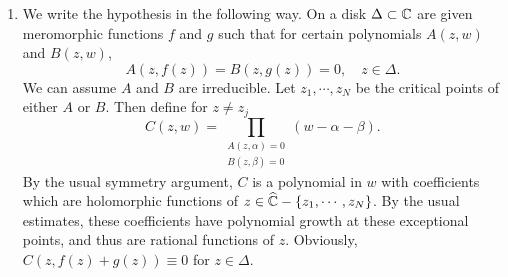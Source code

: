 \documentclass[a4paper,11pt]{article}
\begin{document}
\begin{enumerate}
\item We write the hypothesis in the following way.  On a disk $\Delta
  \subset {\mathbb C}$ are given meromorphic functions $f$ and $g$ such that
  for certain polynomials $A(z,w)$ and $B(z,w)$,
  $$
  A(z, f(z)) = B(z,g(z)) = 0, \quad z \in \Delta.
  $$
  We can assume $A$ and $B$ are irreducible.  Let $z_1, \cdots, z_N$
  be the critical points of either $A$ or $B$.  Then define for $z \ne
  z_j$
  $$
  C(z, w) = \prod_{\substack{A(z,\alpha)=0\\B(z,\beta)=0}} (w - \alpha
  - \beta).
  $$
  By the usual symmetry argument, $C$ is a polynomial in $w$ with
  coefficients which are holomorphic functions of $z \in
  \widehat{{\mathbb C}} - \{z_1, \cdots, z_N\}$.  By the usual estimates,
  these coefficients have polynomial growth at these exceptional
  points, and thus are rational functions of $z$.  Obviously, $C(z,
  f(z) + g(z)) \equiv 0$ for $z \in \Delta$.


\end{enumerate}
\end{document}
